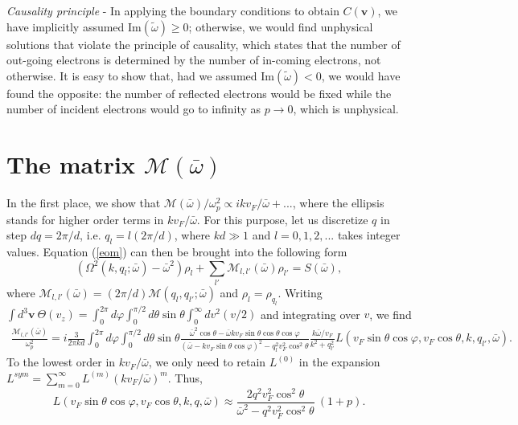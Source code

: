 \documentclass[aps,reprint]{revtex4-1}
\begin{document}
\begin{widetext}
\textit{Causality principle} - In applying the boundary conditions to obtain $C(\mathbf{v})$, we have implicitly assumed Im$(\tilde{\omega})\geq 0$; otherwise, we would find unphysical solutions that violate the principle of causality, which states that the number of out-going electrons is determined by the number of in-coming electrons, not otherwise. It is easy to show that, had we assumed Im$(\tilde{\omega})<0$, we would have found the opposite: the number of reflected electrons would be fixed while the number of incident electrons would go to infinity as $p\rightarrow 0$, which is unphysical. 

\section{The matrix $\mathcal{M}(\bar{\omega})$}
\label{sec:M}
In the first place, we show that $\mathcal{M}(\bar{\omega})/\omega^2_p \propto ikv_F/\bar{\omega} + ...$, where the ellipsis stands for higher order terms in $kv_F/\bar{\omega}$. For this purpose, let us discretize $q$ in step $dq = 2\pi/d$, i.e. $q_l = l (2\pi/d)$, where $kd\gg 1$ and $l=0,1,2,...$ takes integer values. Equation (\ref{eom}) can then be brought into the following form
\begin{equation}
\left(\Omega^2(k,q_l;\bar{\omega}) - \bar{\omega}^2\right)\rho_l + \sum_{l'}\mathcal{M}_{l,l'}(\bar{\omega}) \rho_{l'} = S(\bar{\omega}), \label{b1}
\end{equation}
where $\mathcal{M}_{l,l'}(\bar{\omega}) = (2\pi/d)\mathcal{M}(q_l,q_{l'};\bar{\omega})$ and $\rho_l = \rho_{q_l}$. Writing $\int d^3\mathbf{v} ~\Theta(v_z) = \int^{2\pi}_0d\varphi \int^{\pi/2}_0d\theta \sin\theta \int^{\infty}_0 dv^2 (v/2)$ and integrating over $v$, we find 
\begin{eqnarray}
\frac{\mathcal{M}_{l,l'}(\bar{\omega})}{\omega^2_p} = i \frac{3}{2\pi kd}\int^{2\pi}_0d\varphi \int^{\pi/2}_0d\theta \sin\theta \frac{\bar{\omega}^2\cos\theta-\bar{\omega}kv_F\sin\theta\cos\theta\cos\varphi}{(\bar{\omega}-kv_F\sin\theta\cos\varphi)^2-q^2_{l}v^2_F\cos^2\theta}\frac{k\bar{\omega}/v_F}{k^2+q^2_{l'}} L(v_F\sin\theta\cos\varphi,v_F\cos\theta,k,q_{l'},\bar{\omega}). \label{c1}
\end{eqnarray}
To the lowest order in $kv_F/\bar{\omega}$, we only need to retain $L^{(0)}$ in the expansion $L^{sym} = \sum^{\infty}_{m=0}L^{(m)}\left(kv_F/\bar{\omega}\right)^m$. Thus, 
\begin{equation}
L(v_F\sin\theta\cos\varphi,v_F\cos\theta,k,q,\bar{\omega}) \approx \frac{2q^2v^2_F\cos^2\theta}{\bar{\omega}^2-q^2v^2_F\cos^2\theta}~\left(1+p\right).

\end{equation}
\end{widetext}
\end{document}
